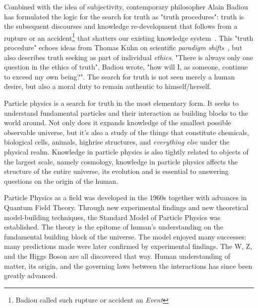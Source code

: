 Combined with the idea of subjectivity, contemporary philosopher Alain Badiou has formulated the logic for the search for truth as "truth procedures": truth is the subsequent discourses and knowledge re-development that follows from a rupture or an accident\footnote{Badiou called such rupture or accident an \textit{Event}} that shatters our existing knowledge system~\cite{badiou2007being}. This "truth procedure" echoes ideas from Thomas Kuhn on scientific \textit{paradigm
shifts}~\cite{kuhn2021structure}, but also describes truth seeking as part of individual \textit{ethics}. "There is always only one question in the ethics of truth", Badiou wrote, "how will I, as someone, continue to exceed my own being?"\cite{badiou2002ethics}. The search for truth is not seen merely a human desire, but also a moral duty to remain authentic to himself/herself.


Particle physics is a search for truth in the most elementary form. It seeks to understand fundamental particles and their interaction as building blocks to the world around. Not only does it expands knowledge of the smallest possible observable universe, but it's also a study of the things that constitute chemicals, biological cells, animals, highrise structures, and \textit{everything else} under the physical realm. Knowledge in particle physics is also tightly related to objects of the largest scale, namely cosmology, knowledge in particle physics affects the structure of the entire universe, its evolution and is essential to answering questions on the origin of the human.

Particle Physics as a field was developed in the 1960s together with advances in Quantum Field Theory. Through new experimental findings and new theoretical model-building techniques, the Standard Model of Particle Physics was established. The theory is the epitome of human's understanding on the fundamental building block of the universe. The model enjoyed many successes: many predictions made were later confirmed by experimental findings. The W, Z, and the Higgs Boson are all discovered that way. Human
understanding of matter, its origin, and the governing laws between the interactions has since been greatly advanced. 

